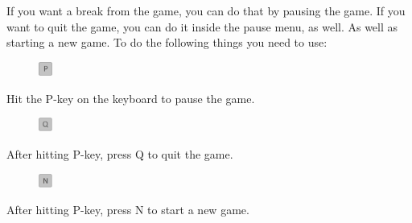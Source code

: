 \documentclass[../master.tex]{subfiles}
\begin{document}
If you want a break from the game, you can do that by pausing the game. If you want to quit the game, you can do it inside the pause menu, as well. As well as starting a new game. To do the following things you need to use:\\
\begin{figure}
	\vspace{-6.6mm}
	\begin{centering}
		\includegraphics[width=0.04\textwidth]{./Pictures/Pause.png}
	\end{centering}
	\vspace{-6mm}
\end{figure}
Hit the P-key on the keyboard to pause the game.\\

\begin{figure}
	\vspace{-6.9mm}
	\begin{centering}
		\includegraphics[width=0.04\textwidth]{./Pictures/Quit.png}
	\end{centering}
	\vspace{-6mm}
\end{figure}
After hitting P-key, press Q to quit the game.\\

\begin{figure}
	\vspace{-6.9mm}
	\begin{centering}
		\includegraphics[width=0.04\textwidth]{./Pictures/New_Game.png}
	\end{centering}
	\vspace{-6mm}
\end{figure}
After hitting P-key, press N to start a new game.\\

\newpage
\end{document}
